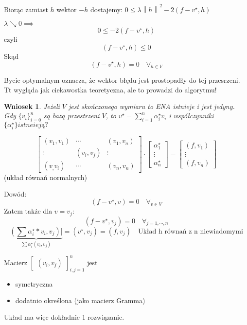 \documentclass[hidelinks,a4paper,fleqn,oneside]{book}
\newcommand{\norm}[1]{\left\lVert#1\right\rVert}
\newtheorem{wniosek}{Wniosek}
\begin{document}
Biorąc zamiast $h$ wektor $-h$ dostajemy: $0 \leq \lambda \norm{h}^2 - 2(f - v^\star, h)$

$\lambda \searrow 0 \implies$
\[
	0 \leq -2(f-v^\star, h)
\] 
czyli
\[
 	(f - v^\star, h) \leq 0
\]
Skąd
\[
	(f-v^\star, h) = 0 \quad \forall_{h \in V}
\]

Bycie optymalnym oznacza, że wektor błędu jest prostopadły do tej przesrzeni. Tt wygląda jak ciekawostka teoretyczna, ale to prowadzi do algorytmu!

\begin{wniosek}
	Jeżeli $V$ jest skończonego wymiaru to ENA istnieje i jest jedyny. Gdy $\{v_i\}^n_{i=0}$ są bazą przestrzeni $V$, to $v^\star = \sum_{i=1}^n \alpha_i^\star v_i$ i współczynniki $\{\alpha_i^\star\} istneieją?$
\end{wniosek}

\[
	\left[
		\begin{array}{ccc}
		(v_1,v_1) & \cdots & (v_1, v_n) \\
		\vdots & (v_i, v_j) & \vdots \\
		(v_, v_i) & \cdots & (v_n, v_n)
		\end{array}
	\right]
	\cdot
	\left[
		\begin{array}{c}
		\alpha_1^\star \\ \vdots \\ \alpha_n^\star
		\end{array}
	\right]
	=
	\left[
		\begin{array}{c}
		(f, v_1) \\
		\vdots \\
		(f, v_n)
		\end{array}
	\right]
\]
(układ równań normalnych)

Dowód:
\[
	(f- v^\star, v) = 0 \quad \forall_{v \in V}
\]
Zatem także dla $v = v_j$:
\[
	(f-v^\star, v_j) = 0 \quad \forall_{j = 1, \cdots, n}
\]
\[
	\underbrace{(\sum \alpha_i^\star *v_i, v_j)]}_{\sum \alpha_i^\star(v_i, v_j)} = (v^\star, v_j) = (f, v_j) \quad \textrm{Układ h równań z n niewiadomymi}
\]

Macierz $\left[ \begin{array}{c} (v_i, v_j) \end{array} \right]_{i, j=1}^n$ jest
\begin{itemize}
	\item symetryczna
	\item dodatnio określona (jako macierz Gramma)
\end{itemize}

Układ ma więc dokładnie 1 rozwiązanie.
\end{document}
